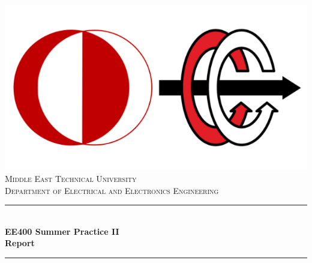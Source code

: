 \begin{titlepage}

\newcommand{\HRule}{\rule{\linewidth}{0.5mm}} %

\center %

\includegraphics[scale=0.3]{odtuee.png}\\[1cm]
 

 

\textsc{\LARGE Middle East Technical University}\\[1.5cm] %
\textsc{\Large Department of Electrical and Electronics Engineering }\\[0.5cm] %


\HRule \\[0.4cm]

{ \huge \bfseries \large EE400 Summer Practice II \\ Report}\\[0cm] %
\HRule \\[1cm]
 

\end{titlepage}
